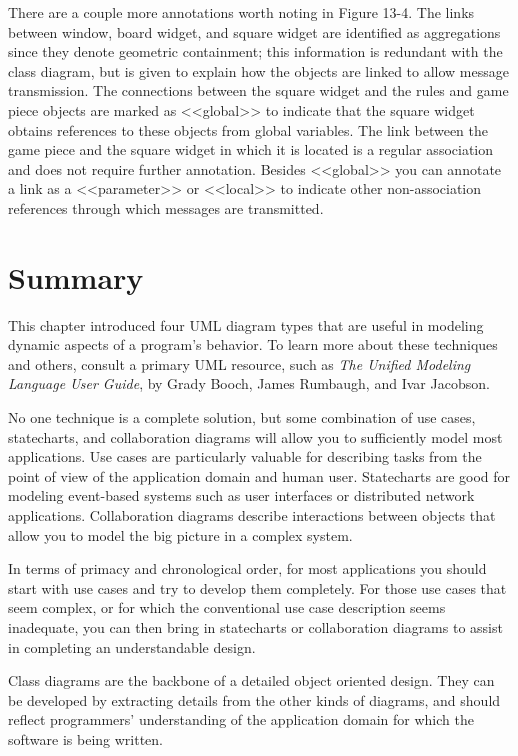 \bigskip

There are a couple more annotations worth noting in Figure 13-4. The links
between window, board widget, and square widget are identified as aggregations
since they denote geometric containment; this information is redundant with the
class diagram, but is given to explain how the objects are linked to allow
message transmission. The connections between the square widget and the rules
and game piece objects are marked as
{\textless}{\textless}global{\textgreater}{\textgreater} to indicate that the
square widget obtains references to these objects from global variables. The
link between the game piece and the square widget in which it is located is a
regular association and does not require further annotation. Besides
{\textless}{\textless}global{\textgreater}{\textgreater} you can annotate a
link as a {\textless}{\textless}parameter{\textgreater}{\textgreater} or
{\textless}{\textless}local{\textgreater}{\textgreater} to indicate other
non-association references through which messages are transmitted.

\section{Summary}

This chapter introduced four UML diagram types that
are useful in modeling dynamic aspects of a program's behavior. To
learn more about these techniques and others, consult
a primary UML resource, such as
\textit{The Unified Modeling Language User Guide}, by
Grady Booch, James Rumbaugh, and Ivar Jacobson.

No one technique is a complete solution, but some combination of use
cases, statecharts, and collaboration diagrams will allow you to
sufficiently model most applications. Use cases are particularly
valuable for describing tasks from the point of view of the
application domain and human user. Statecharts are good for modeling
event-based systems such as user interfaces or distributed network
applications.  Collaboration diagrams describe interactions between
objects that allow you to model the big picture in a complex system.

In terms of primacy and chronological order, for most applications you should
start with use cases and try to develop them completely. For those use cases
that seem complex, or for which the conventional use case description seems
inadequate, you can then bring in statecharts or collaboration diagrams to
assist in completing an understandable design.

Class diagrams are the backbone of a detailed object oriented design.  They can
be developed by extracting details from the other kinds of diagrams, and should
reflect programmers' understanding of the application domain for which the
software is being written.
